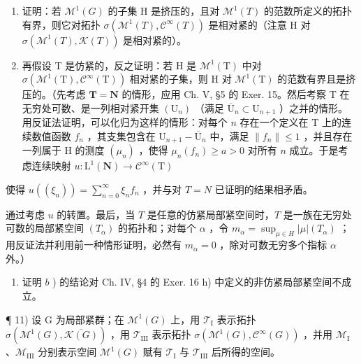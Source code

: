 \begin{enumerate}
\def\labelenumi{\alph{enumi})}
\item
  证明：若 \(\mathcal{M}^{1}(G)\) 的子集 H 是挤压的，且对 \(\mathcal{M}^{1}(T)\) 的范数所定义的拓扑有界，则它对拓扑 \(\sigma(\mathcal{M}^{1}(T),\mathcal{C}^{\infty}(T))\) 是相对紧的（注意 H 对 \(\sigma(\mathcal{M}^{1}(T),\mathcal{K}(T))\) 是相对紧的）。
\item
  再假设 T 是仿紧的，反之证明：若 H 是 \(\mathcal{M}^1 (\mathrm{T})\) 中对 \(\sigma (\mathcal{M}^1 (\mathrm{T}),\mathcal{C}^\infty (\mathrm{T}))\) 相对紧的子集，则 H 对 \(\mathcal{M}^1 (\mathrm{T})\) 的范数有界且是挤压的。（先考虑 \(\mathbf{T} = \mathbf{N}\) 的情形，应用 Ch. V, §5 的 Exer. 15。然后考察 T 在无穷处可数、是一列相对紧开集 \((\mathrm{U}_n)\) （满足 \(\overline{\mathrm{U}}_n\subset \mathrm{U}_{n + 1}\) ）之并的情形。用反证法证明，可以化归为这样的情形：对每个 \(n\) 存在一个定义在 T 上的连续数值函数 \(f_{n}\) ，其支集包含在 \(\mathrm{U}_{n + 1} - \overline{\mathrm{U}}_n\) 中，满足 \(\| f_n\| \leqslant 1\) ，并且存在一列属于 H 的测度 \((\mu_n)\) ，使得 \(\mu_{n}(f_{n})\geqslant a > 0\) 对所有 \(n\) 成立。于是考虑连续映射 \(u:\mathrm{L}^{1}(\mathbf{N})\to \mathcal{C}^{\infty}(\mathrm{T})\)
\end{enumerate}

使得 \(u((\xi_n)) = \sum_{n=0}^{\infty} \xi_n f_n\) ，并与对 \(T = N\) 已证明的结果相矛盾。

通过考虑 \(u\) 的转置。最后，当 \(T\) 是任意的仿紧局部紧空间时，\(T\) 是一族在无穷处可数的局部紧空间 \((T_{\alpha})\) 的拓扑和；对每个 \(\alpha\) ，令 \(m_{\alpha} = \sup_{\mu \in H} |\mu|(T_{\alpha})\) ；用反证法并利用前一种情形证明，必然有 \(m_{\alpha} = 0\) ，除对可数无穷多个指标 \(\alpha\) 外。）

\begin{enumerate}
\def\labelenumi{\alph{enumi})}
\setcounter{enumi}{2}
\tightlist
\item
  证明 \(b\) ) 的结论对 Ch. IV, §4 的 Exer. 16 h) 中定义的非仿紧局部紧空间不成立。
\end{enumerate}

¶ 11) 设 G 为局部紧群；在 \(\mathcal{M}^{1}(G)\) 上，用 \(\mathcal{T}_{\mathrm{I}}\) 表示拓扑 \(\sigma(\mathcal{M}^{1}(G), \overline{\mathcal{K}(G)})\) ，用 \(\mathcal{T}_{\mathrm{III}}\) 表示拓扑 \(\sigma(\mathcal{M}^{1}(G), \mathcal{C}^{\infty}(G))\) ，并用 \(\mathcal{M}_{\mathrm{I}}\) 、\(\mathcal{M}_{\mathrm{III}}\) 分别表示空间 \(\mathcal{M}^{1}(G)\) 赋有 \(\mathcal{T}_{\mathrm{I}}\) 与 \(\mathcal{T}_{\mathrm{III}}\) 后所得的空间。

